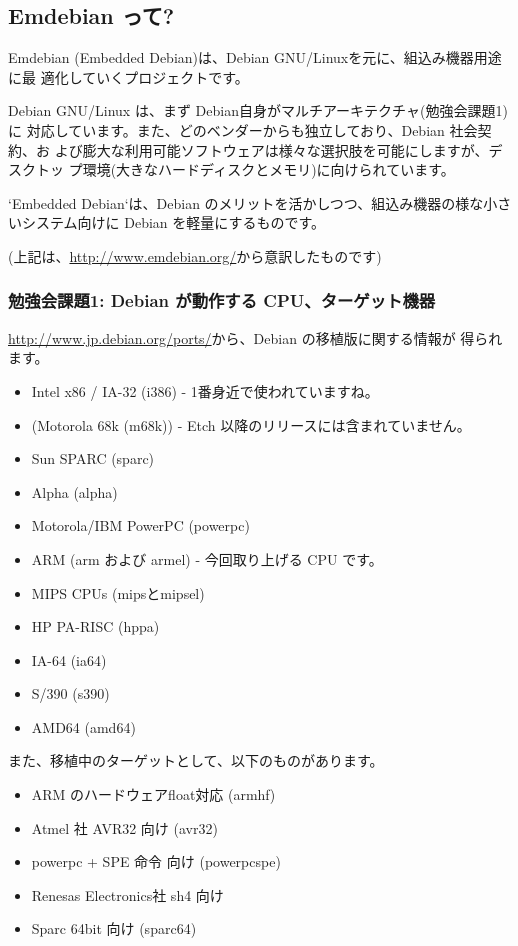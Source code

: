 \documentclass[mingoth,a4paper]{jsarticle}
\begin{document}
\subsection{Emdebian って?}

Emdebian (Embedded Debian)は、Debian GNU/Linuxを元に、組込み機器用途に最
適化していくプロジェクトです。

Debian GNU/Linux は、まず Debian自身がマルチアーキテクチャ(勉強会課題1)に
対応しています。また、どのベンダーからも独立しており、Debian 社会契約、お
よび膨大な利用可能ソフトウェアは様々な選択肢を可能にしますが、デスクトッ
プ環境(大きなハードディスクとメモリ)に向けられています。

`Embedded Debian`は、Debian のメリットを活かしつつ、組込み機器の様な小さ
いシステム向けに Debian を軽量にするものです。

(上記は、\url{http://www.emdebian.org/}から意訳したものです)

\subsubsection{勉強会課題1: Debian が動作する CPU、ターゲット機器}

\url{http://www.jp.debian.org/ports/}から、Debian の移植版に関する情報が
得られます。

\begin{itemize}
 
 \item Intel x86 / IA-32 (i386) - 1番身近で使われていますね。 
 \item (Motorola 68k (m68k)) - Etch 以降のリリースには含まれていません。
 \item  Sun SPARC (sparc)

 \item  Alpha (alpha)
 \item  Motorola/IBM PowerPC (powerpc)
 \item  ARM (arm および armel) - 今回取り上げる CPU です。
 \item  MIPS CPUs (mipsとmipsel)
 \item  HP PA-RISC (hppa)
 \item  IA-64 (ia64)
 \item  S/390 (s390)
 \item  AMD64 (amd64)
\end{itemize}
また、移植中のターゲットとして、以下のものがあります。
\begin{itemize}
 \item ARM のハードウェアfloat対応 (armhf) 
 \item Atmel 社 AVR32 向け (avr32)
 \item powerpc + SPE 命令 向け (powerpcspe)
 \item Renesas Electronics社 sh4 向け
 \item Sparc 64bit 向け (sparc64)
\end{itemize}
\end{document}
